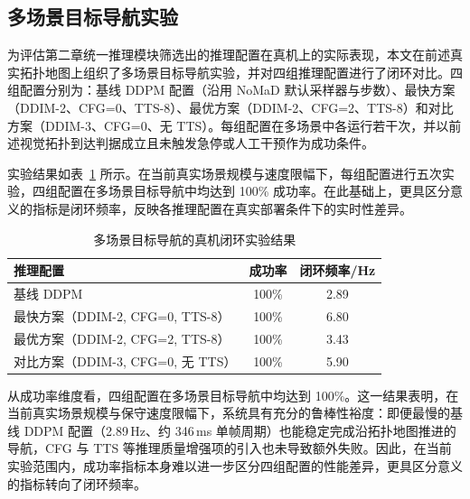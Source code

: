 \subsection{多场景目标导航实验}

为评估第二章统一推理模块筛选出的推理配置在真机上的实际表现，本文在前述真实拓扑地图上组织了多场景目标导航实验，并对四组推理配置进行了闭环对比。四组配置分别为：基线 DDPM 配置（沿用 NoMaD 默认采样器与步数）、最快方案（DDIM-2、CFG=0、TTS-8）、最优方案（DDIM-2、CFG=2、TTS-8）和对比方案（DDIM-3、CFG=0、无 TTS）。每组配置在多场景中各运行若干次，并以前述视觉拓扑到达判据成立且未触发急停或人工干预作为成功条件。

实验结果如表~\ref{tab:real-multiscene-navigate} 所示。在当前真实场景规模与速度限幅下，每组配置进行五次实验，四组配置在多场景目标导航中均达到 100\% 成功率。在此基础上，更具区分意义的指标是闭环频率，反映各推理配置在真实部署条件下的实时性差异。

\begin{table}[htbp]
    \centering
    \caption{多场景目标导航的真机闭环实验结果}
    \label{tab:real-multiscene-navigate}
    \begin{tabular}{lcc}
        \toprule
        推理配置 & 成功率 & 闭环频率/Hz \\
        \midrule
        基线 DDPM & 100\% & 2.89 \\
        最快方案（DDIM-2, CFG=0, TTS-8） & 100\% & 6.80 \\
        最优方案（DDIM-2, CFG=2, TTS-8） & 100\% & 3.43 \\
        对比方案（DDIM-3, CFG=0, 无 TTS） & 100\% & 5.90 \\
        \bottomrule
    \end{tabular}
\end{table}

从成功率维度看，四组配置在多场景目标导航中均达到 100\%。这一结果表明，在当前真实场景规模与保守速度限幅下，系统具有充分的鲁棒性裕度：即便最慢的基线 DDPM 配置（2.89\,Hz、约 346\,ms 单帧周期）也能稳定完成沿拓扑地图推进的导航，CFG 与 TTS 等推理质量增强项的引入也未导致额外失败。因此，在当前实验范围内，成功率指标本身难以进一步区分四组配置的性能差异，更具区分意义的指标转向了闭环频率。

